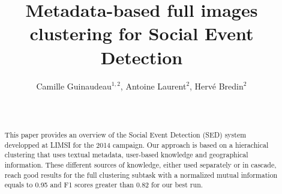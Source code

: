 \documentclass{acm_proc_article-me11_tweaked}
\begin{document}
\title{Metadata-based full images clustering for Social Event Detection}
%
%
%
%
%

%
\author{
Camille Guinaudeau$^{1,2}$, Antoine Laurent$^{2}$, Herv\'{e} Bredin$^{2}$\\
       \\
       \\
}


\maketitle
\begin{abstract}
This paper provides an overview of the Social Event Detection (SED) system developped at LIMSI for the 2014 campaign. Our approach is based on a hierachical clustering that uses textual metadata, user-based knowledge and geographical information. These different sources of knowledge, either used separately or in cascade, reach good results for the full clustering subtask with a normalized mutual information equals to 0.95 and F1 scores greater than 0.82 for our best run.

\end{abstract}
\end{document}
